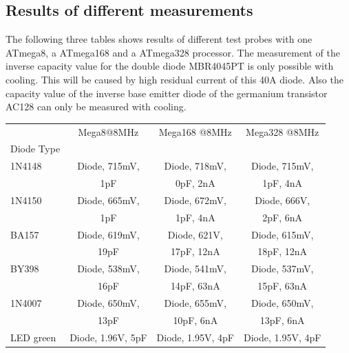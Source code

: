 \subsection{Results of different measurements}
The following three tables shows results of different test probes 
with one ATmega8, a ATmega168 and a ATmega328 processor.
The measurement of the inverse capacity value for the double diode MBR4045PT is 
only possible with cooling. This will be caused by high residual current of this 40A diode.
Also the capacity value of the inverse base emitter diode of the germanium transistor AC128 can
only be measured with cooling.

\begin{table}[H]
  \begin{center}
    \begin{tabular}{| l | c | c | c |}
    \hline
           & Mega8@8MHz & Mega168 @8MHz & Mega328 @8MHz \\
 Diode Type  &                  &                  &                  \\
    \hline
    \hline
1N4148     & Diode, 715mV,        & Diode, 718mV,            & Diode, 715mV,           \\
           &               1pF    &               0pF, 2nA   &               1pF, 4nA  \\
    \hline
1N4150     & Diode, 665mV,        & Diode, 672mV,            & Diode, 666V,           \\
           &               1pF    &               1pF, 4nA   &              2pF, 6nA  \\
    \hline
BA157      & Diode, 619mV,        & Diode, 621V,              & Diode, 615mV,            \\
           &               19pF   &              17pF, 12nA   &               18pF, 12nA \\
    \hline
BY398      & Diode, 538mV,        & Diode, 541mV,             & Diode, 537mV,            \\
           &               16pF   &               14pF, 63nA  &               15pF, 63nA \\
    \hline
1N4007     & Diode, 650mV,        & Diode, 655mV,            & Diode, 650mV,           \\
           &               13pF   &               10pF, 6nA  &               13pF, 6nA \\
    \hline
LED green  & Diode, 1.96V, 5pF    & Diode, 1.95V, 4pF   & Diode, 1.95V, 4pF \\
    \hline

\end{tabular}
\end{center}
\end{table}
